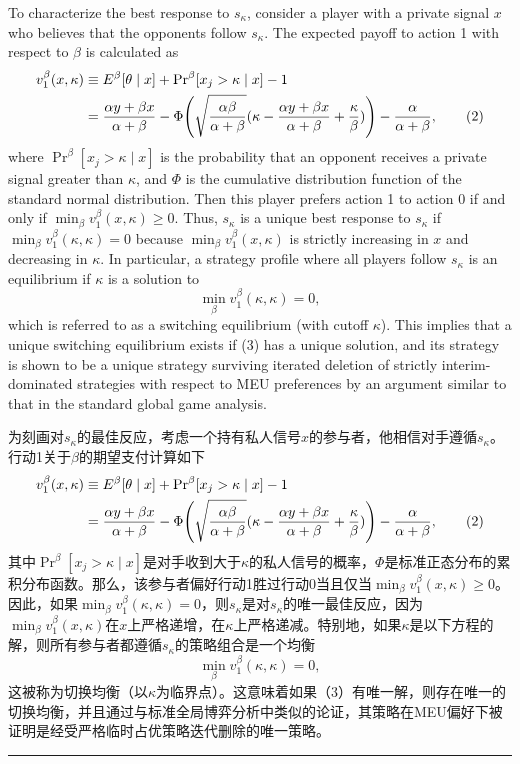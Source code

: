 \documentclass[12pt,a4paper]{article}
\newenvironment{original}
  {\par\medskip\noindent\color{black}\ignorespaces}
  {\par\medskip}
\newenvironment{translation}
  {\par\noindent\color{darkblue}\ignorespaces}
  {\par\medskip\noindent\hrule\par\medskip}
\theoremstyle{definition}
\theoremstyle{remark}
\begin{document}
\begin{original}
To characterize the best response to $s_\kappa$, consider a player with a private signal $x$ who believes that the opponents follow $s_\kappa$. The expected payoff to action 1 with respect to $\beta$ is calculated as
\begin{align}
v_1^\beta(x, \kappa) &\equiv E^\beta[\theta \mid x] + \Pr\nolimits^\beta[x_j > \kappa \mid x] - 1 \notag\\
&= \frac{\alpha y + \beta x}{\alpha + \beta} - \Phi\!\left(\sqrt{\frac{\alpha\beta}{\alpha+\beta}}(\kappa - \frac{\alpha y + \beta x}{\alpha + \beta} + \frac{\kappa}{\beta})\right) - \frac{\alpha}{\alpha+\beta},
\tag{2}
\end{align}
where $\Pr^\beta[x_j > \kappa \mid x]$ is the probability that an opponent receives a private signal greater than $\kappa$, and $\Phi$ is the cumulative distribution function of the standard normal distribution. Then this player prefers action 1 to action 0 if and only if $\min_{\beta} v_1^\beta(x, \kappa) \ge 0$. Thus, $s_\kappa$ is a unique best response to $s_\kappa$ if $\min_{\beta} v_1^\beta(\kappa, \kappa) = 0$ because $\min_{\beta} v_1^\beta(x, \kappa)$ is strictly increasing in $x$ and decreasing in $\kappa$. In particular, a strategy profile where all players follow $s_\kappa$ is an equilibrium if $\kappa$ is a solution to
\[
\min_{\beta} v_1^\beta(\kappa, \kappa) = 0,
\tag{3}
\]
which is referred to as a switching equilibrium (with cutoff $\kappa$). This implies that a unique switching equilibrium exists if (3) has a unique solution, and its strategy is shown to be a unique strategy surviving iterated deletion of strictly interim-dominated strategies with respect to MEU preferences by an argument similar to that in the standard global game analysis.
\end{original}
\begin{translation}
为刻画对$s_\kappa$的最佳反应，考虑一个持有私人信号$x$的参与者，他相信对手遵循$s_\kappa$。行动1关于$\beta$的期望支付计算如下
\begin{align}
v_1^\beta(x, \kappa) &\equiv E^\beta[\theta \mid x] + \Pr\nolimits^\beta[x_j > \kappa \mid x] - 1 \notag\\
&= \frac{\alpha y + \beta x}{\alpha + \beta} - \Phi\!\left(\sqrt{\frac{\alpha\beta}{\alpha+\beta}}(\kappa - \frac{\alpha y + \beta x}{\alpha + \beta} + \frac{\kappa}{\beta})\right) - \frac{\alpha}{\alpha+\beta},
\tag{2}
\end{align}
其中$\Pr^\beta[x_j > \kappa \mid x]$是对手收到大于$\kappa$的私人信号的概率，$\Phi$是标准正态分布的累积分布函数。那么，该参与者偏好行动1胜过行动0当且仅当$\min_{\beta} v_1^\beta(x, \kappa) \ge 0$。因此，如果$\min_{\beta} v_1^\beta(\kappa, \kappa) = 0$，则$s_\kappa$是对$s_\kappa$的唯一最佳反应，因为$\min_{\beta} v_1^\beta(x, \kappa)$在$x$上严格递增，在$\kappa$上严格递减。特别地，如果$\kappa$是以下方程的解，则所有参与者都遵循$s_\kappa$的策略组合是一个均衡
\[
\min_{\beta} v_1^\beta(\kappa, \kappa) = 0,
\tag{3}
\]
这被称为切换均衡（以$\kappa$为临界点）。这意味着如果（3）有唯一解，则存在唯一的切换均衡，并且通过与标准全局博弈分析中类似的论证，其策略在MEU偏好下被证明是经受严格临时占优策略迭代删除的唯一策略。
\end{translation}
\end{document}
